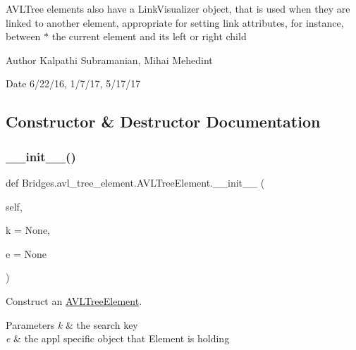 A\+V\+L\+Tree elements also have a Link\+Visualizer object, that is used when they are linked to another element, appropriate for setting link attributes, for instance, between $\ast$ the current element and its left or right child

\begin{DoxyAuthor}{Author}
Kalpathi Subramanian, Mihai Mehedint
\end{DoxyAuthor}
\begin{DoxyDate}{Date}
6/22/16, 1/7/17, 5/17/17 
\end{DoxyDate}


\subsection{Constructor \& Destructor Documentation}
\mbox{\label{class_bridges_1_1avl__tree__element_1_1_a_v_l_tree_element_af08d7ab277c031a48c00623fe09f7bca}} 
\subsubsection{\texorpdfstring{\+\_\+\+\_\+init\+\_\+\+\_\+()}{\_\_init\_\_()}}
{\footnotesize\ttfamily def Bridges.\+avl\+\_\+tree\+\_\+element.\+A\+V\+L\+Tree\+Element.\+\_\+\+\_\+init\+\_\+\+\_\+ (\begin{DoxyParamCaption}\item[{}]{self,  }\item[{}]{k = {\ttfamily None},  }\item[{}]{e = {\ttfamily None} }\end{DoxyParamCaption})}



Construct an \mbox{\hyperlink{class_bridges_1_1avl__tree__element_1_1_a_v_l_tree_element}{A\+V\+L\+Tree\+Element}}. 


\begin{DoxyParams}{Parameters}
{\em k} & the search key \\
\hline
{\em e} & the appl specific object that Element is holding \\
\hline
\end{DoxyParams}


